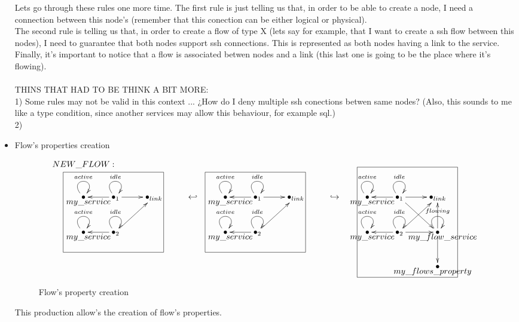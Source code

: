 \documentclass[envcountsect,runningheads]{llncs}
\begin{document}
\begin{itemize}
  Lets go through these rules one more time. The first rule is just telling us that, in order to be able to
  create a node, I need a connection between this node's (remember that this conection can be either
  logical or physical).\\
  The second rule is telling us that, in order to create a flow of type X (lets say for example, 
  that I want to create a ssh flow between this nodes), I need to guarantee that 
  both nodes support ssh connections. This is represented as both nodes having 
  a link to the service. \\
  Finally, it's important to notice that a flow is associated betwen nodes and a link 
  (this last one is going to be the place where it's flowing).\\
  \\
  THINS THAT HAD TO BE THINK A BIT MORE: \\
  1) Some rules may not be valid in this context ... ¿How do I deny multiple ssh 
  conections betwen same nodes? (Also, this sounds to me like a type condition, since another
  services may allow this behaviour, for example sql.) \\
  2) 
 
  \item Flow's properties creation
  \begin{figure}[H]
    \[
       \xymatrix@C=25pt@R=30pt
       {
         {}\POS[]-<0pc,0pc>\drop{NEW\_FLOW:}
         \\
         {\bullet}\ar@(ul,ur)^{active} \POS[]-<-.5pc,.5pc> \drop{my\_service} &
         {\bullet}_{1}\ar@(ul,ur)^{idle}\ar@{->}[l]\ar@{->}[r] &
         {\bullet}_{link}
         & {\hookleftarrow} & 
         {\bullet}\ar@(ul,ur)^{active} \POS[]-<-.5pc,.5pc> \drop{my\_service} &
         {\bullet}_{1}\ar@(ul,ur)^{idle}\ar@{->}[l]\ar@{->}[r] &
         {\bullet}_{link} 
         & {\hookrightarrow} & 
         {\bullet}\ar@(ul,ur)^{active} \POS[]-<-.5pc,.5pc> \drop{my\_service} &
         {\bullet}_{1}\ar@(ul,ur)^{idle}\ar@{->}[l]\ar@{->}[r]\ar@{->}[dr] &
         {\bullet}_{link}
         \\
         {\bullet}\ar@(ul,ur)^{active}\POS[]-<-.5pc,.5pc> \drop{my\_service} \POS[]+<3pc,2pc>*+=<10pc,8pc>[F-]{} &
         {\bullet}_{2}\ar@(ul,ur)^{idle}\ar@{->}[l]\ar@{->}[ur]
         & & &
         {\bullet}\ar@(ul,ur)^{active}\POS[]-<-.5pc,.5pc> \drop{my\_service} \POS[]+<3pc,2pc>*+=<10pc,8pc>[F-]{} &
         {\bullet}_{2}\ar@(ul,ur)^{idle}\ar@{->}[l]\ar@{->}[ur]
         & & &
        {\bullet}\ar@(ul,ur)^{active}\POS[]-<-.5pc,.5pc> \drop{my\_service} \POS[]+<3pc,2pc>*+=<10pc,8pc>[]{} &
         {\bullet}_{2}\ar@(ul,ur)^{idle}\ar@{->}[l]\ar@{->}[ur]\ar@{->}[r] &
         {\bullet}\ar@(ul,ur)^{flowing}\ar@{->}[u]\ar@{->}[d] \POS[]+<-3pc,1pc>*+=<10pc,11pc>[F-]{} 
         \POS[]-<-.5pc,.5pc>\drop{my\_flow\_service}
         \\\
         & & & & & & & & & &{\bullet}\POS[]-<.5pc,.5pc> \drop{my\_flows\_property}
      }
    \]
    \caption{Flow's property creation}
    \protect\label{fig:flowpropertycreation}
  \end{figure}
  This production allow's the creation of flow's properties.\\
  

\end{itemize}
\end{document}
